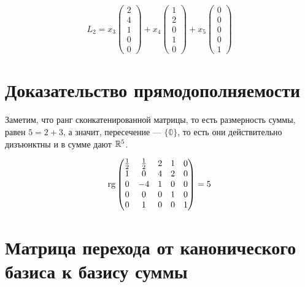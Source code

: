 \documentclass[12pt, a4paper]{article}
\begin{document}
    \begin{equation}
        L_2 = x_3 \left(\begin{matrix}
            2 \\
            4 \\
            1 \\
            0 \\
            0
        \end{matrix}\right) + x_4 \left(\begin{matrix}
            1 \\
            2 \\
            0 \\
            1 \\
            0
            \end{matrix}\right) + x_5 \begin{pmatrix}
            0 \\ 0\\0\\0\\1
        \end{pmatrix}
    \end{equation}

    \section{Доказательство прямодополняемости}
    Заметим, что ранг сконкатенированной матрицы, 
    то есть размерность суммы, равен $5 = 2 + 3$, 
    а значит, пересечение — $\{\mathbb{0}\}$, 
    то есть они действительно дизъюнктны и в сумме дают ${\mathbb{R}}^5$.

    \begin{equation}
        \operatorname{rg} \left(\begin{matrix}
            \frac{1}{2} & \frac{1}{2} & 2 & 1 & 0 \\
            1 & 0 & 4 & 2 & 0 \\
            0 & -4 & 1 & 0 & 0 \\
            0 & 0 & 0 & 1 & 0 \\
            0 & 1 & 0 & 0 & 1
        \end{matrix}\right) = 5
    \end{equation}

    \section{Матрица перехода от канонического базиса к базису суммы}
\end{document}
